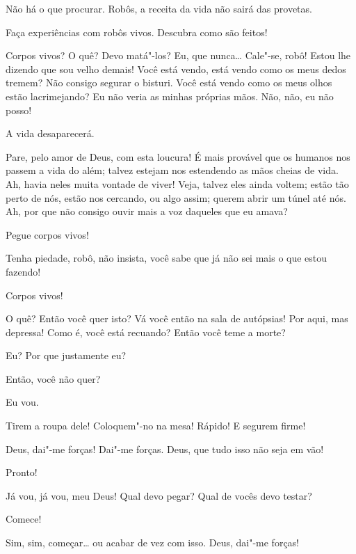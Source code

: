  Não há o que procurar. Robôs, a receita da vida não sairá das provetas.

 Faça experiências com robôs vivos. Descubra como são feitos!

 Corpos vivos? O quê? Devo matá"-los? Eu, que nunca\ldots{} Cale"-se,
robô! Estou lhe dizendo que sou velho demais! Você está vendo, está vendo como os
meus dedos tremem? Não consigo segurar o bisturi. Você está vendo como os meus
olhos estão lacrimejando? Eu não veria as minhas próprias mãos. Não, não, eu não
posso!

 A vida desaparecerá.

 Pare, pelo amor de Deus, com esta loucura! É mais provável que os
humanos nos passem a vida do além; talvez estejam nos estendendo as mãos cheias
de vida. Ah, havia neles muita vontade de viver! Veja, talvez eles ainda voltem;
estão tão perto de nós, estão nos cercando, ou algo assim; querem abrir um túnel
até nós. Ah, por que não consigo ouvir mais a voz daqueles que eu amava?

 Pegue corpos vivos!

 Tenha piedade, robô, não insista, você sabe que já não
sei mais o que estou fazendo!

 Corpos vivos!

 O quê? Então você quer isto? Vá você então na sala de autópsias!
Por aqui, mas depressa! Como é, você está recuando? Então você teme a
morte?

 Eu? Por que justamente eu?

 Então, você não quer?

 Eu vou. 

  Tirem a roupa dele! Coloquem"-no na mesa! Rápido! E
segurem firme!

   Deus, dai"-me forças! Dai"-me
forças. Deus, que tudo isso não seja em vão! 

 Pronto!

 Já vou, já vou, meu Deus!  Qual devo pegar?  Qual de
vocês devo testar?

 Comece!

 Sim, sim, começar\ldots{} ou acabar de vez com isso. Deus, dai"-me forças! 

